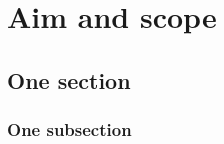 \chapter{Aim and scope}

\lipsum[7]

\section{One section}

\lipsum[3]

\subsection{One subsection}

\lipsum[3]
